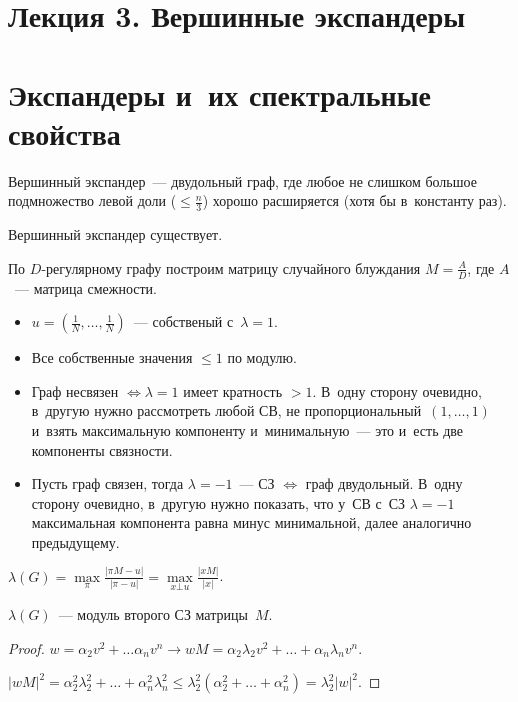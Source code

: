\documentclass{article}
\begin{document}
\section*{Лекция 3. Вершинные экспандеры}
\resetcntrs

\section{Экспандеры и~их спектральные свойства}

Вершинный экспандер~--- двудольный граф, где любое не слишком большое
подмножество левой доли ($\le \frac{n}{3}$) хорошо расширяется (хотя бы
в~константу раз).

\begin{claim}
	Вершинный экспандер существует.
\end{claim}

По $D$-регулярному графу построим матрицу случайного блуждания
$M = \frac{A}{D}$, где $A$~--- матрица смежности.

\begin{itemize}
	\item $u = (\frac{1}{N}, \ldots, \frac{1}{N})$~--- собственый с~$\lambda = 1$.
	\item Все собственные значения $\le 1$ по модулю.
	\item Граф несвязен $\Leftrightarrow \lambda = 1$ имеет кратность $> 1$.
		В~одну сторону очевидно, в~другую нужно рассмотреть любой СВ, не
		пропорциональный~$(1, \ldots, 1)$ и~взять максимальную компоненту
		и~минимальную~--- это и~есть две компоненты связности.
	\item Пусть граф связен, тогда $\lambda = -1$~--- СЗ $\Leftrightarrow$ граф
		двудольный. В~одну сторону очевидно, в~другую нужно показать, что у~СВ с~СЗ
		$\lambda = -1$ максимальная компонента равна минус минимальной, далее
		аналогично предыдущему.
\end{itemize}

\begin{definition}
	$\lambda(G) = \max\limits_\pi \frac{\left| \pi M - u\right|}{\left| \pi - u
	\right|} = \max\limits_{x \bot u} \frac{|xM|}{|x|}$.
\end{definition}

\begin{claim}
	$\lambda(G)$~--- модуль второго СЗ матрицы~$M$.
\end{claim}
\begin{proof}
	$w = \alpha_2 v^2 + \ldots \alpha_n v^n \rightarrow wM = \alpha_2 \lambda_2
	v^2 + \ldots + \alpha_n \lambda_n v^n$.

	$|wM|^2 = \alpha_2^2 \lambda_2^2 + \ldots + \alpha_n^2 \lambda_n^2 \le
	\lambda_2^2 (\alpha_2^2 + \ldots + \alpha_n^2) = \lambda_2^2 |w|^2$.
\end{proof}
\end{document}
